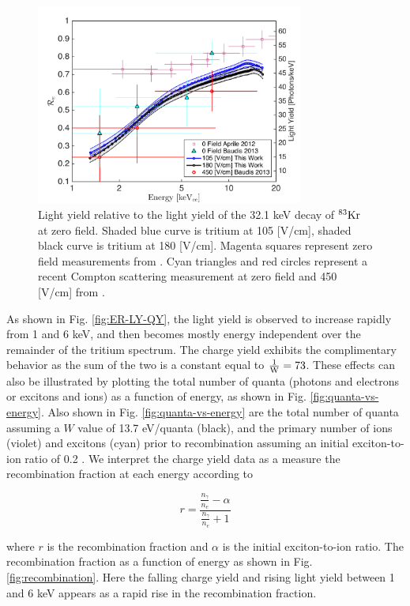  \begin{figure}[h!]\centering
\includegraphics[width=88mm]{fig/Re_LY_log.png}
\caption{Light yield relative to the light yield of the 32.1 keV decay of $\rm^{83}Kr $ at zero field. Shaded blue curve is tritium at 105 [V/cm], shaded black curve is tritium at 180 [V/cm]. Magenta squares represent zero field measurements from \cite{Aprile_LY}. Cyan triangles and red circles represent a recent Compton scattering measurement at zero field and 450 [V/cm] from \cite{Baudis}. }
\label{fig:Re_LY}
\end{figure}


As shown in Fig. \ref{fig:ER-LY-QY}, the light yield is observed to increase rapidly from 1 and 6 keV, and then becomes mostly energy independent over the remainder of the tritium spectrum. The charge yield exhibits the complimentary behavior as the sum of the two is a constant equal to $\rm \frac{1}{W}=73$. These effects can also be illustrated by plotting the total number of quanta (photons and electrons or excitons and ions) as a function of energy, as shown in Fig. \ref{fig:quanta-vs-energy}. Also shown in Fig. \ref{fig:quanta-vs-energy} are the total number of quanta assuming a $W$ value of 13.7 eV/quanta (black), and the primary number of ions (violet) and excitons (cyan) prior to recombination assuming an initial exciton-to-ion ratio of 0.2 \cite{alpha-value}. We interpret the charge yield data as a measure the recombination fraction at each energy according to

\begin{displaymath}
r = \frac{\frac{n_{\gamma}}{n_e} - \alpha}{\frac{n_{\gamma}}{n_e} + 1}
\end{displaymath}

\noindent
where $r$ is the recombination fraction and $\alpha$ is the initial exciton-to-ion ratio. The recombination fraction as a function of energy as shown in Fig. \ref{fig:recombination}. Here the falling charge yield and rising light yield between 1 and 6 keV appears as a rapid rise in the recombination fraction. 


